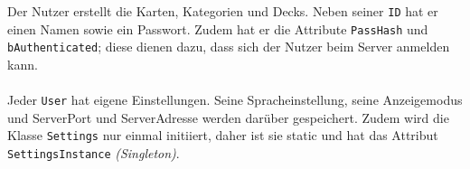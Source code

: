 \documentclass[fontsize=12pt,paper=a4,twoside]{scrartcl}
\begin{document}
Der Nutzer erstellt die Karten, Kategorien und Decks. Neben seiner \texttt{ID} hat er einen Namen sowie ein Passwort. Zudem hat er die Attribute \texttt{PassHash} und \texttt{bAuthenticated}; diese dienen dazu, dass sich der Nutzer beim Server anmelden kann. \\
\\

Jeder \texttt{User} hat eigene Einstellungen. Seine Spracheinstellung, seine Anzeigemodus und ServerPort und ServerAdresse werden darüber gespeichert.
Zudem wird die Klasse \texttt{Settings} nur einmal initiiert, daher ist sie static und hat das Attribut \texttt{SettingsInstance} \textit{(Singleton)}.

\begin{landscape}
    \thispagestyle{empty}
    
\end{landscape}
\end{document}
